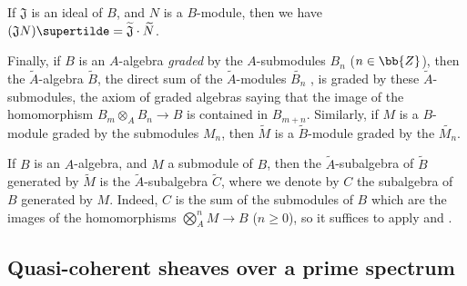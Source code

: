 \begin{env}[1.3.13]
If $\mathfrak{J}$ is an ideal of $B$, and $N$ is a $B$-module, then we have $(\mathfrak{J}N)\supertilde=\widetilde{\mathfrak{J}}\cdot\widetilde{N}$.

Finally, if $B$ is an $A$-algebra \emph{graded} by the $A$-submodules $B_n$ ($n\in\bb{Z}$), then the $\widetilde{A}$-algebra $\widetilde{B}$, the direct sum of the $\widetilde{A}$-modules $\widetilde{B_n}$ , is graded by these $\widetilde{A}$-submodules, the axiom of graded algebras saying that the image of the homomorphism $B_m\otimes_A B_n\to B$ is contained in $B_{m+n}$.
Similarly, if $M$ is a $B$-module graded by the submodules $M_n$, then $\widetilde{M}$ is a $\widetilde{B}$-module graded by the $\widetilde{M_n}$.
\end{env}

\begin{env}[1.3.14]
\label{I.1.3.14}
If $B$ is an $A$-algebra, and $M$ a submodule of $B$, then the $\widetilde{A}$-subalgebra of $\widetilde{B}$ generated by $\widetilde{M}$  is the $\widetilde{A}$-subalgebra $\widetilde{C}$, where we denote by $C$ the subalgebra of $B$ generated by $M$.
Indeed, $C$ is the sum of the submodules of $B$ which are the images of the homomorphisms $\bigotimes_A^n M\to B$ ($n\geq 0$), so it suffices to apply  and .
\end{env}

\subsection{Quasi-coherent sheaves over a prime spectrum}
\label{subsection:I.1.4}

